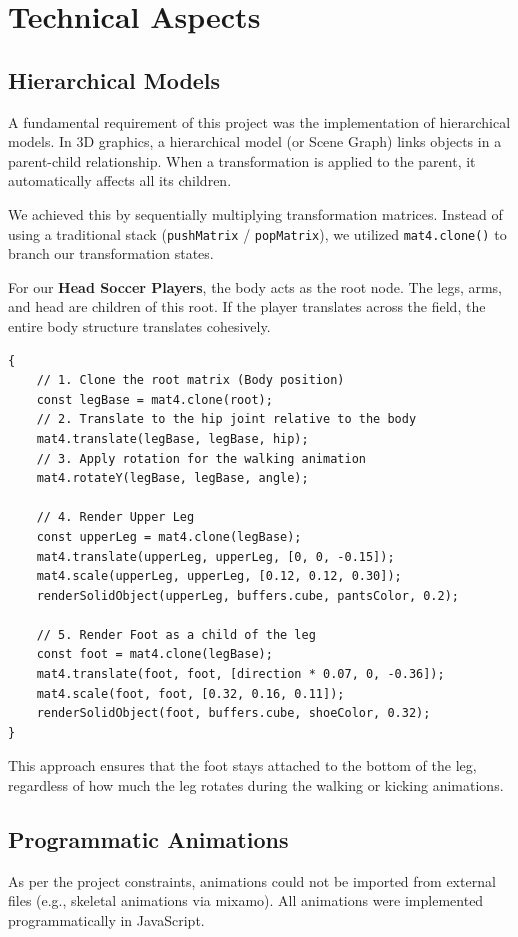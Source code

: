 \documentclass[10pt]{book}
\begin{document}
\chapter{Technical Aspects}

\section{Hierarchical Models}
A fundamental requirement of this project was the implementation of hierarchical models. In 3D graphics, a hierarchical model (or Scene Graph) links objects in a parent-child relationship. When a transformation is applied to the parent, it automatically affects all its children. 

We achieved this by sequentially multiplying transformation matrices. Instead of using a traditional stack (\texttt{pushMatrix} / \texttt{popMatrix}), we utilized \texttt{mat4.clone()} to branch our transformation states.

For our \textbf{Head Soccer Players}, the body acts as the root node. The legs, arms, and head are children of this root. If the player translates across the field, the entire body structure translates cohesively.

\begin{lstlisting}[style=vscode_C, caption=Procedural Walking Animation Math]{
    // 1. Clone the root matrix (Body position)
    const legBase = mat4.clone(root);
    // 2. Translate to the hip joint relative to the body
    mat4.translate(legBase, legBase, hip);
    // 3. Apply rotation for the walking animation
    mat4.rotateY(legBase, legBase, angle);

    // 4. Render Upper Leg
    const upperLeg = mat4.clone(legBase);
    mat4.translate(upperLeg, upperLeg, [0, 0, -0.15]);
    mat4.scale(upperLeg, upperLeg, [0.12, 0.12, 0.30]);
    renderSolidObject(upperLeg, buffers.cube, pantsColor, 0.2);

    // 5. Render Foot as a child of the leg
    const foot = mat4.clone(legBase);
    mat4.translate(foot, foot, [direction * 0.07, 0, -0.36]);
    mat4.scale(foot, foot, [0.32, 0.16, 0.11]);
    renderSolidObject(foot, buffers.cube, shoeColor, 0.32);
}
\end{lstlisting}
This approach ensures that the foot stays attached to the bottom of the leg, regardless of how much the leg rotates during the walking or kicking animations.

\section{Programmatic Animations}
As per the project constraints, animations could not be imported from external files (e.g., skeletal animations via mixamo). All animations were implemented programmatically in JavaScript.
\end{document}
